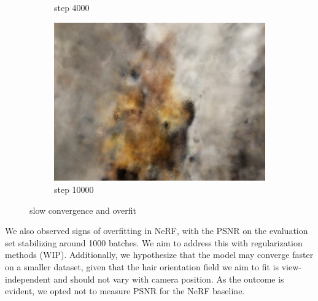 \documentclass[12pt]{article}
\begin{document}
\begin{figure}[h]
\begin{subfigure}{0.3\textwidth}
            \caption{step 4000}
        \end{subfigure}
        \hfill
        \begin{subfigure}{0.3\textwidth}
            \centering
            \includegraphics[width=\textwidth]{project-milestone/images/nerf_pred/nerf_10000.png}
            \caption{step 10000}
        \end{subfigure}
        
      \caption{slow convergence and overfit}
      \label{fig:nerf_slow}
  \end{figure}

  We also observed signs of overfitting in NeRF, with the PSNR on the evaluation set stabilizing around 1000 batches. We aim to address this with regularization methods (WIP). Additionally, we hypothesize that the model may converge faster on a smaller dataset, given that the hair orientation field we aim to fit is view-independent and should not vary with camera position. As the outcome is evident, we opted not to measure PSNR for the NeRF baseline.


\end{document}
